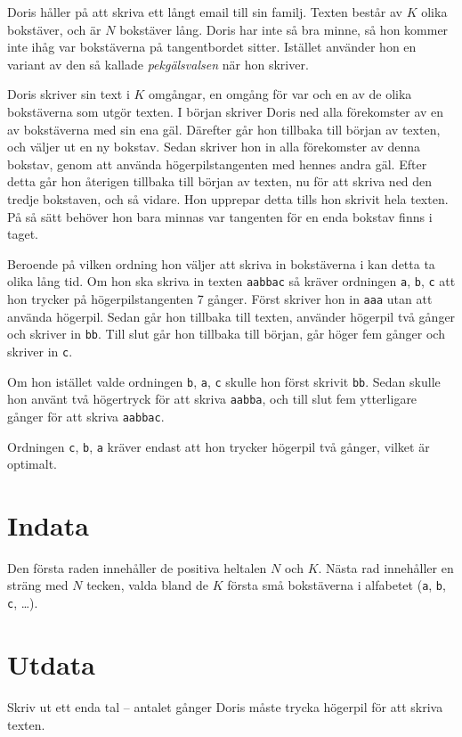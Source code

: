\def\version{1}
Doris håller på att skriva ett långt email till sin familj.
Texten består av $K$ olika bokstäver, och är $N$ bokstäver lång.
Doris har inte så bra minne, så hon kommer inte ihåg var bokstäverna på tangentbordet sitter.
Istället använder hon en variant av den så kallade \emph{pekgälsvalsen} när hon skriver.

Doris skriver sin text i $K$ omgångar, en omgång för var och en av de olika bokstäverna som utgör texten.
I början skriver Doris ned alla förekomster av en av bokstäverna med sin ena gäl.
Därefter går hon tillbaka till början av texten, och väljer ut en ny bokstav.
Sedan skriver hon in alla förekomster av denna bokstav, genom att använda högerpilstangenten med hennes andra gäl.
Efter detta går hon återigen tillbaka till början av texten, nu för att skriva ned den tredje bokstaven, och så vidare.
Hon upprepar detta tills hon skrivit hela texten.
På så sätt behöver hon bara minnas var tangenten för en enda bokstav finns i taget.

Beroende på vilken ordning hon väljer att skriva in bokstäverna i kan detta ta olika lång tid.
Om hon ska skriva in texten \texttt{aabbac} så kräver ordningen \texttt{a}, \texttt{b}, \texttt{c} att hon trycker på högerpilstangenten 7 gånger.
Först skriver hon in \texttt{aaa} utan att använda högerpil.
Sedan går hon tillbaka till texten, använder högerpil två gånger och skriver in \texttt{bb}.
Till slut går hon tillbaka till början, går höger fem gånger och skriver in \texttt{c}.

Om hon istället valde ordningen \texttt{b}, \texttt{a}, \texttt{c} skulle hon först skrivit \texttt{bb}.
Sedan skulle hon använt två högertryck för att skriva \texttt{aabba}, och till slut fem ytterligare gånger för att skriva \texttt{aabbac}.

Ordningen \texttt{c}, \texttt{b}, \texttt{a} kräver endast att hon trycker högerpil två gånger, vilket är optimalt.

\section*{Indata}
Den första raden innehåller de positiva heltalen $N$ och $K$.
Nästa rad innehåller en sträng med $N$ tecken, valda bland de $K$ första små bokstäverna i alfabetet (\texttt{a}, \texttt{b}, \texttt{c}, \dots).

\section*{Utdata}
Skriv ut ett enda tal -- antalet gånger Doris måste trycka högerpil för att skriva texten.

